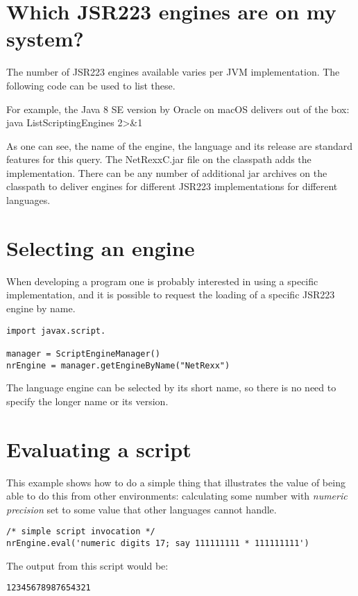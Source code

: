 \section{Which JSR223 engines are on my system?}
The number of JSR223 engines available varies per JVM
implementation. The following code can be used to list these.
 

For example, the Java 8 SE version by Oracle on macOS delivers out of
the box:
\bash[stdout]
java ListScriptingEngines 2>&1
\END

As one can see, the name of the engine, the language and its release are standard features for this query. The NetRexxC.jar file on the classpath adds the \nr{} implementation.
There can be any number of additional jar archives on the classpath to deliver engines for different JSR223 implementations for different languages.
\section{Selecting an engine}
When developing a program one is probably interested in using a specific implementation, and it is possible to request the loading of a specific JSR223 engine by name.
\begin{lstlisting}[label=choosingjsr223,caption=Choosing an engine]
import javax.script.

manager = ScriptEngineManager()
nrEngine = manager.getEngineByName("NetRexx")
\end{lstlisting}
The language engine can be selected by its short name, so there is no need to specify the longer name or its version.
\section{Evaluating a script}
This example shows how to do a simple thing that illustrates the value of being able to do this from other environments: calculating some number with \emph{numeric precision} set to some value that other languages cannot handle.
\begin{lstlisting}[label=evaljsr223,caption=Evaluating a script]
/* simple script invocation */
nrEngine.eval('numeric digits 17; say 111111111 * 111111111')
\end{lstlisting}
The output from this script would be:
\begin{alltt}
12345678987654321
\end{alltt}
